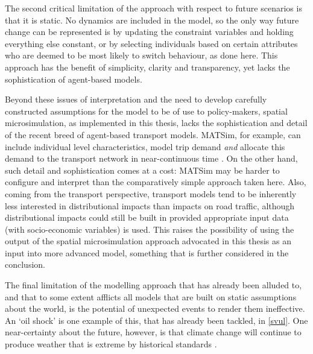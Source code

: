 The second critical limitation of the approach with respect to future scenarios
is that it is static. No dynamics are included in the model, so the only way future
change can be represented is by updating the constraint variables and holding
everything else constant, or by selecting individuals based on certain attributes
who are deemed to be most likely to switch behaviour, as done here. This approach
has the benefit of simplicity, clarity and transparency, yet lacks the sophistication
of agent-based models.

Beyond these issues of interpretation and the need to develop carefully constructed
assumptions for the model to be of use to policy-makers, spatial
microsimulation, as implemented in this thesis, lacks the sophistication and
detail of the recent breed of agent-based transport models. MATSim, for example,
can include individual level characteristics, model trip demand \emph{and}
allocate
this demand to the transport network in near-continuous time \citep{Balmer2009}.
On the other hand, such detail and sophistication comes at a cost: MATSim
may be harder to configure and interpret than the comparatively simple approach
taken here. Also, coming from the transport perspective, transport models
tend to be inherently less interested in distributional impacts than impacts
on road traffic, although distributional impacts could still be built in
provided appropriate input data (with socio-economic variables) is used.
This raises the possibility of using the output of the spatial microsimulation
approach advocated in this thesis as an input into more advanced model,
something that is further considered in the conclusion.

The final limitation of the modelling approach that has already been alluded to,
and that to some extent afflicts all models that are built on static
assumptions about the world, is the potential of unexpected events to render
them ineffective. An `oil shock' is one example of this, that has already been
tackled, in \cref{svul}. One near-certainty about the future, however, is
that climate change will continue to produce weather that is extreme by
historical standards \citep{Koetse2009}.

